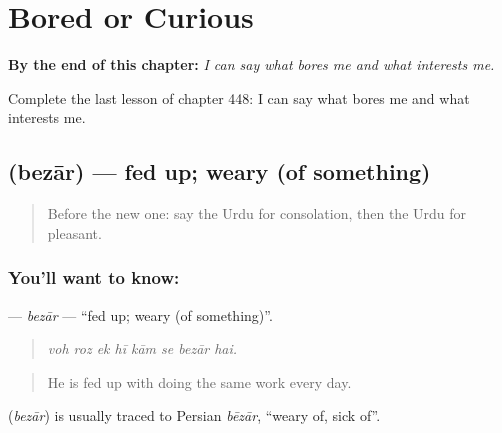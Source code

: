 
\chapter{Bored or Curious}
\label{ch:ur-bored-or-curious}

\begin{chapteropening}
\textbf{By the end of this chapter:} \emph{I can say what bores me and what interests me.}

Complete the last lesson of chapter 448: I can say what bores me and what interests me.
\end{chapteropening}

\section[\texorpdfstring{\ur{بیزار} (bezār)}{بیزار (bezār)}]{ (bezār) — fed up; weary (of something)}

\label{lesson:UR-C448-bezar}



\begin{quote}
Before the new one: say the Urdu for consolation, then the Urdu for pleasant.
\end{quote}

\subsection*{You'll want to know: }
\textbf{} — \emph{bezār} — \textquotedblleft{}fed up; weary (of something)\textquotedblright{}.

\begin{quote}
       
\end{quote}

\begin{quote}
\emph{voh roz ek hī kām se bezār hai.}
\end{quote}

\begin{quote}
He is fed up with doing the same work every day.
\end{quote}

\begin{cousinweb}
\textbf{} (\emph{bezār}) is usually traced to Persian \emph{bēzār}, \textquotedblleft{}weary of, sick of\textquotedblright{}.
\end{cousinweb}

